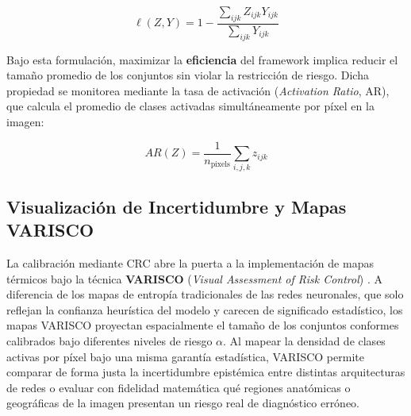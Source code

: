 \begin{equation}
\ell(Z, Y) = 1 - \frac{\sum_{ijk} Z_{ijk} Y_{ijk}}{\sum_{ijk} Y_{ijk}}
\end{equation}

Bajo esta formulación, maximizar la \textbf{eficiencia} del framework implica reducir el tamaño promedio de los conjuntos sin violar la restricción de riesgo. Dicha propiedad se monitorea mediante la tasa de activación (\textit{Activation Ratio}, AR), que calcula el promedio de clases activadas simultáneamente por píxel en la imagen:

\begin{equation}
AR(Z) = \frac{1}{n_{\text{pixels}}} \sum_{i,j,k} z_{ijk}
\end{equation}

\subsection{Visualización de Incertidumbre y Mapas VARISCO}
La calibración mediante CRC abre la puerta a la implementación de mapas térmicos bajo la técnica \textbf{VARISCO} (\textit{Visual Assessment of Risk Control}) \cite{segment_cp_2024}. A diferencia de los mapas de entropía tradicionales de las redes neuronales, que solo reflejan la confianza heurística del modelo y carecen de significado estadístico, los mapas VARISCO proyectan espacialmente el tamaño de los conjuntos conformes calibrados bajo diferentes niveles de riesgo $\alpha$. Al mapear la densidad de clases activas por píxel bajo una misma garantía estadística, VARISCO permite comparar de forma justa la incertidumbre epistémica entre distintas arquitecturas de redes o evaluar con fidelidad matemática qué regiones anatómicas o geográficas de la imagen presentan un riesgo real de diagnóstico erróneo.

\vspace{1em}

